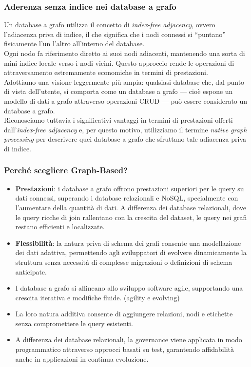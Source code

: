 \subsubsection*{Aderenza senza indice nei database a grafo}

Un database a grafo utilizza il concetto di \emph{index-free adjacency}, ovvero l'adiacenza priva di indice, il che significa che i nodi connessi si “puntano” fisicamente l’un l’altro all'interno del database.
\\
Ogni nodo fa riferimento diretto ai suoi nodi adiacenti, mantenendo una sorta di mini-indice locale verso i nodi vicini. Questo approccio rende le operazioni di attraversamento estremamente economiche in termini di prestazioni.
\\
Adottiamo una visione leggermente più ampia: qualsiasi database che, dal punto di vista dell'utente, si comporta come un database a grafo — cioè espone un modello di dati a grafo attraverso operazioni CRUD — può essere considerato un database a grafo.
\\
Riconosciamo tuttavia i significativi vantaggi in termini di prestazioni offerti dall’\emph{index-free adjacency} e, per questo motivo, utilizziamo il termine \emph{native graph processing} per descrivere quei database a grafo che sfruttano tale adiacenza priva di indice.

\subsubsection*{Perché scegliere Graph-Based?}
\begin{itemize}
    \item \textbf{Prestazioni}: i database a grafo offrono prestazioni superiori per le query su dati connessi, superando i database relazionali e NoSQL, specialmente con l'aumentare della quantità di dati. A differenza dei database relazionali, dove le query ricche di join rallentano con la crescita del dataset, le query nei grafi restano efficienti e localizzate.
    \item \textbf{Flessibilità}: la natura priva di schema dei grafi consente una modellazione dei dati adattiva, permettendo agli sviluppatori di evolvere dinamicamente la struttura senza necessità di complesse migrazioni o definizioni di schema anticipate.
    \item I database a grafo si allineano allo sviluppo software agile, supportando una crescita iterativa e modifiche fluide. (agility e evolving)
    \item La loro natura additiva consente di aggiungere relazioni, nodi e etichette senza compromettere le query esistenti.
    \item A differenza dei database relazionali, la governance viene applicata in modo programmatico attraverso approcci basati su test, garantendo affidabilità anche in applicazioni in continua evoluzione.
\end{itemize}

